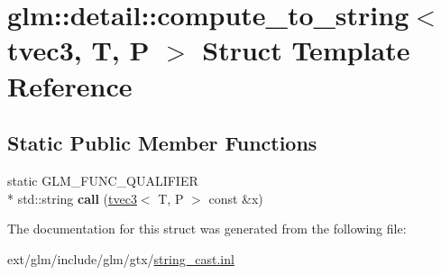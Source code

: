 \hypertarget{structglm_1_1detail_1_1compute__to__string_3_01tvec3_00_01_t_00_01_p_01_4}{\section{glm\-:\-:detail\-:\-:compute\-\_\-to\-\_\-string$<$ tvec3, T, P $>$ Struct Template Reference}
\label{structglm_1_1detail_1_1compute__to__string_3_01tvec3_00_01_t_00_01_p_01_4}
}
\subsection*{Static Public Member Functions}
\begin{DoxyCompactItemize}
\item 
\hypertarget{structglm_1_1detail_1_1compute__to__string_3_01tvec3_00_01_t_00_01_p_01_4_acf3706c18e3084b171b0bcfe4ea64ffa}{static G\-L\-M\-\_\-\-F\-U\-N\-C\-\_\-\-Q\-U\-A\-L\-I\-F\-I\-E\-R \\*
std\-::string {\bfseries call} (\hyperlink{structglm_1_1tvec3}{tvec3}$<$ T, P $>$ const \&x)}\label{structglm_1_1detail_1_1compute__to__string_3_01tvec3_00_01_t_00_01_p_01_4_acf3706c18e3084b171b0bcfe4ea64ffa}

\end{DoxyCompactItemize}


The documentation for this struct was generated from the following file\-:\begin{DoxyCompactItemize}
\item 
ext/glm/include/glm/gtx/\hyperlink{string__cast_8inl}{string\-\_\-cast.\-inl}\end{DoxyCompactItemize}
